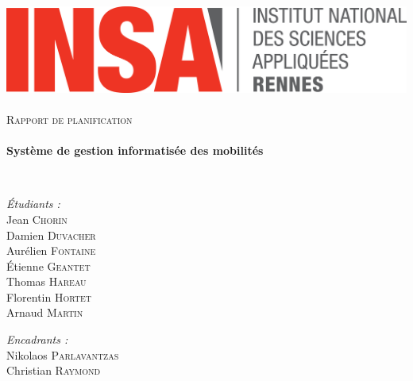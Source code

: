 \begin{titlepage}
        \begin{sffamily}
            \begin{center}

                \includegraphics[width=400pt]{logo_INSA.png}~\\[2.5cm]

                \textsc{\huge Rapport de planification}\\[2.5cm]

                \HRule \\[0.4cm]
                { \huge \bfseries Système de gestion informatisée des mobilités\\[0.4cm] }

                \HRule \\[4cm]

                \begin{minipage}{0.4\textwidth}
                    \begin{flushleft} \large
                        \emph{Étudiants :}\\
                        Jean \textsc{Chorin}\\
                        Damien \textsc{Duvacher}\\
                        Aurélien \textsc{Fontaine}\\
                        Étienne \textsc{Geantet}\\
                        Thomas \textsc{Hareau}\\
                        Florentin \textsc{Hortet}\\
                        Arnaud \textsc{Martin}\\
                    \end{flushleft}
                \end{minipage}
                \begin{minipage}{0.5\textwidth}
                    \begin{flushright} \large
                        \emph{Encadrants :} \\
                        Nikolaos \textsc{Parlavantzas}\\
                        Christian \textsc{Raymond}
                    \end{flushright}
                \end{minipage}


\end{center}
\end{sffamily}
\end{titlepage}
